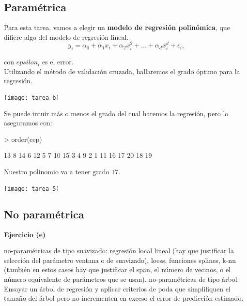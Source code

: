 \documentclass[a4paper,12pt]{article}
\newenvironment{exercise}[1]%
{%
  \par\vspace{\baselineskip}\noindent
  \textbf{Ejercicio (#1)}\begin{itshape}%
  \par\vspace{\baselineskip}\noindent\ignorespaces
}%
{%
  \end{itshape}\ignorespacesafterend
}
\begin{document}
\subsection{Paramétrica}

Para esta tarea, vamos a elegir un \textbf{modelo de regresi\'on polin\'omica}, que difiere algo del modelo de regresi\'on lineal. \\

\begin{equation*}
y_i = \alpha_0 + \alpha_1 x_i + \alpha_2 x_i^2 +  \dots + \alpha_d x_i^d + \epsilon_i\text{,}
\end{equation*}

con $epsilon_i$ es el error.\\

Utilizando el m\'etodo de validaci\'on cruzada, hallaremos el grado \'optimo para la regresi\'on.

\begin{Schunk}
\end{Schunk}
\texttt{[image: tarea-b]}

Se puede intuir m\'as o menos el grado del cual haremos la regresi\'on, pero lo aseguramos con:

\begin{Schunk}
\begin{Sinput}
> order(eep)
\end{Sinput}
\begin{Soutput}
 [1] 13  8 14  6 12  5  7 10 15  3  4  9  2  1 11 16 17 20 18 19
\end{Soutput}
\end{Schunk}

Nuestro polinomio va a tener grado $17$. 

\texttt{[image: tarea-5]}


\subsection{No paramétrica}
\begin{exercise}{e}
no-param\'etricas de tipo suavizado: regresi\'on local lineal (hay que justificar la selecci\'on del par\'ametro ventana o de suavizado), loess, funciones
splines, k-nn (tambi\'en en estos casos hay que justificar el span, el n\'umero
de vecinos, o el n\'umero equivalente de par\'ametros que se usan).
no-param\'etricas de tipo \'arbol. Ensayar un \'arbol de regresi\'on y aplicar
criterios de poda que simplifiquen el tama\~no del \'arbol pero no incrementen
en exceso el error de predicci\'on estimado.
\end{exercise}
\end{document}
